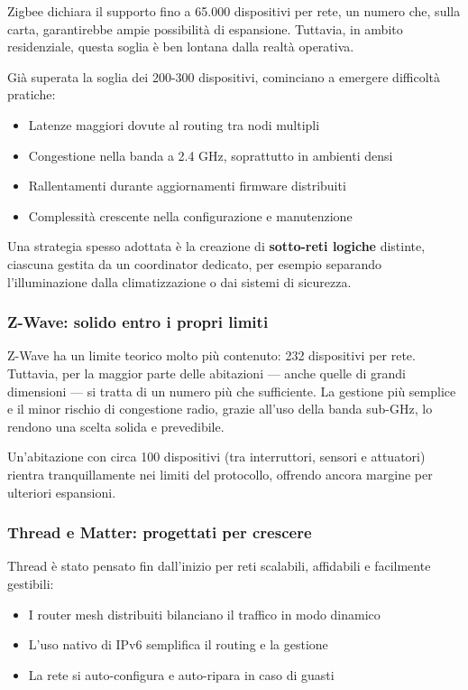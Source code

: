 Zigbee dichiara il supporto fino a 65.000 dispositivi per rete, un numero che, sulla carta, garantirebbe ampie possibilità di espansione. Tuttavia, in ambito residenziale, questa soglia è ben lontana dalla realtà operativa.

Già superata la soglia dei 200-300 dispositivi, cominciano a emergere difficoltà pratiche:
\begin{itemize}
    \item Latenze maggiori dovute al routing tra nodi multipli
    \item Congestione nella banda a 2.4 GHz, soprattutto in ambienti densi
    \item Rallentamenti durante aggiornamenti firmware distribuiti
    \item Complessità crescente nella configurazione e manutenzione
\end{itemize}

Una strategia spesso adottata è la creazione di \textbf{sotto-reti logiche} distinte, ciascuna gestita da un coordinator dedicato, per esempio separando l’illuminazione dalla climatizzazione o dai sistemi di sicurezza.

\subsubsection{Z-Wave: solido entro i propri limiti}

Z-Wave ha un limite teorico molto più contenuto: 232 dispositivi per rete. Tuttavia, per la maggior parte delle abitazioni — anche quelle di grandi dimensioni — si tratta di un numero più che sufficiente. La gestione più semplice e il minor rischio di congestione radio, grazie all’uso della banda sub-GHz, lo rendono una scelta solida e prevedibile.

Un'abitazione con circa 100 dispositivi (tra interruttori, sensori e attuatori) rientra tranquillamente nei limiti del protocollo, offrendo ancora margine per ulteriori espansioni.

\subsubsection{Thread e Matter: progettati per crescere}

Thread è stato pensato fin dall’inizio per reti scalabili, affidabili e facilmente gestibili:
\begin{itemize}
    \item I router mesh distribuiti bilanciano il traffico in modo dinamico
    \item L'uso nativo di IPv6 semplifica il routing e la gestione
    \item La rete si auto-configura e auto-ripara in caso di guasti
\end{itemize}

